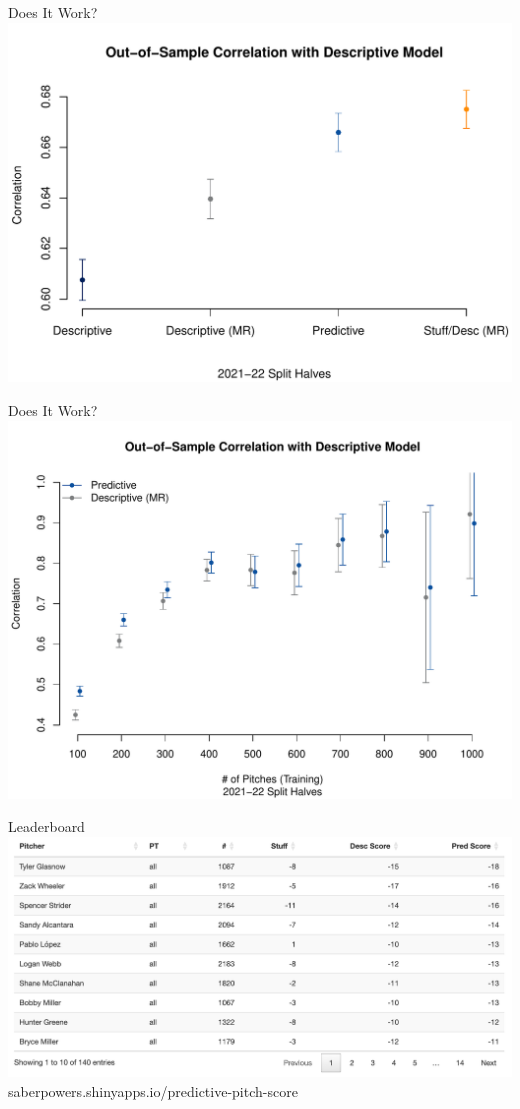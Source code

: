 \documentclass{beamer}
\begin{document}
  \begin{frame}{Does It Work?}
    \centering
    \includegraphics[width = \textwidth]{images/cor_overall_4.pdf}
  \end{frame}
 
  \begin{frame}{Does It Work?}
    \centering
    \includegraphics[width = \textwidth]{images/cor_by_sample_size.pdf}
  \end{frame}
 
  \begin{frame}{Leaderboard}
    \centering
    \includegraphics[width = \textwidth]{images/leaderboard.png}
    \vfill
    \centering \scriptsize {\color{ricerichblue}saberpowers}{\color{ricegray}.shinyapps.io/}{\color{ricerichblue}predictive-pitch-score}\\
  \end{frame}
\end{document}

